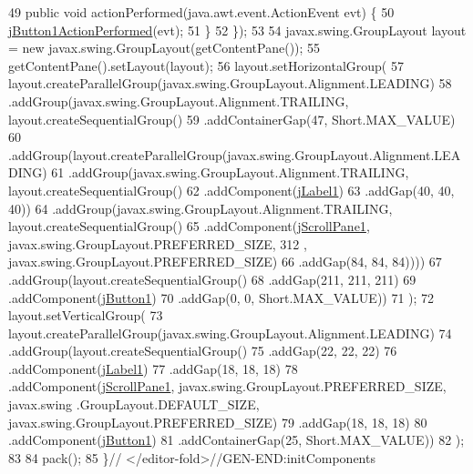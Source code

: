 \begin{DoxyCode}
49             \textcolor{keyword}{public} \textcolor{keywordtype}{void} actionPerformed(java.awt.event.ActionEvent evt) \{
50                 \mbox{\hyperlink{classsoftware_1_1parasoftware5_a2288f6e6870dddebb4be6b9279a85016}{jButton1ActionPerformed}}(evt);
51             \}
52         \});
53 
54         javax.swing.GroupLayout layout = \textcolor{keyword}{new} javax.swing.GroupLayout(getContentPane());
55         getContentPane().setLayout(layout);
56         layout.setHorizontalGroup(
57             layout.createParallelGroup(javax.swing.GroupLayout.Alignment.LEADING)
58             .addGroup(javax.swing.GroupLayout.Alignment.TRAILING, layout.createSequentialGroup()
59                 .addContainerGap(47, Short.MAX\_VALUE)
60                 .addGroup(layout.createParallelGroup(javax.swing.GroupLayout.Alignment.LEADING)
61                     .addGroup(javax.swing.GroupLayout.Alignment.TRAILING, layout.createSequentialGroup()
62                         .addComponent(\mbox{\hyperlink{classsoftware_1_1parasoftware5_af4b23e74de14b990bb7d45f82d6f6e99}{jLabel1}})
63                         .addGap(40, 40, 40))
64                     .addGroup(javax.swing.GroupLayout.Alignment.TRAILING, layout.createSequentialGroup()
65                         .addComponent(\mbox{\hyperlink{classsoftware_1_1parasoftware5_a6f96f0532db133badaa13805011edbbf}{jScrollPane1}}, javax.swing.GroupLayout.PREFERRED\_SIZE, 312
      , javax.swing.GroupLayout.PREFERRED\_SIZE)
66                         .addGap(84, 84, 84))))
67             .addGroup(layout.createSequentialGroup()
68                 .addGap(211, 211, 211)
69                 .addComponent(\mbox{\hyperlink{classsoftware_1_1parasoftware5_ab414e05e8b6d539af83f7c8f6c77f61f}{jButton1}})
70                 .addGap(0, 0, Short.MAX\_VALUE))
71         );
72         layout.setVerticalGroup(
73             layout.createParallelGroup(javax.swing.GroupLayout.Alignment.LEADING)
74             .addGroup(layout.createSequentialGroup()
75                 .addGap(22, 22, 22)
76                 .addComponent(\mbox{\hyperlink{classsoftware_1_1parasoftware5_af4b23e74de14b990bb7d45f82d6f6e99}{jLabel1}})
77                 .addGap(18, 18, 18)
78                 .addComponent(\mbox{\hyperlink{classsoftware_1_1parasoftware5_a6f96f0532db133badaa13805011edbbf}{jScrollPane1}}, javax.swing.GroupLayout.PREFERRED\_SIZE, javax.swing
      .GroupLayout.DEFAULT\_SIZE, javax.swing.GroupLayout.PREFERRED\_SIZE)
79                 .addGap(18, 18, 18)
80                 .addComponent(\mbox{\hyperlink{classsoftware_1_1parasoftware5_ab414e05e8b6d539af83f7c8f6c77f61f}{jButton1}})
81                 .addContainerGap(25, Short.MAX\_VALUE))
82         );
83 
84         pack();
85     \}\textcolor{comment}{// </editor-fold>//GEN-END:initComponents}
\end{DoxyCode}
\mbox{\label{classsoftware_1_1parasoftware5_a2288f6e6870dddebb4be6b9279a85016}} 
